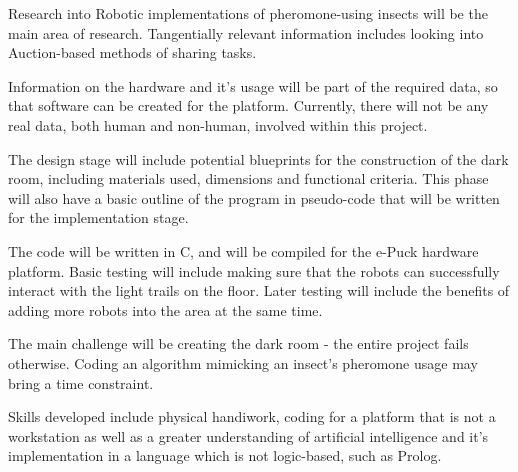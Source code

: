 Research into Robotic implementations of pheromone-using insects will be the 
main area of research\cite{Yanovski2003,Ranjbar-Sahraei2012,Broecker2015}.
Tangentially relevant information includes looking into Auction-based
methods of sharing tasks\cite{Schneider2015}.

Information on the hardware and it's usage will be part of the required data,
so that software can be created for the platform.  Currently, there will not be
any real data, both human and non-human, involved within this project.

The design stage will include potential blueprints for the construction of the 
dark room, including materials used, dimensions and functional criteria.
This phase will also have a basic outline of the program in pseudo-code that 
will be written for the implementation stage.  

The code will be written in C, and will be compiled for the e-Puck hardware
platform.  Basic testing will include making sure that the robots can
successfully interact with the light trails on the floor.  Later testing will
include the benefits of adding more robots into the area at the same time.

The main challenge will be creating the dark room - the entire project fails
otherwise.  Coding an algorithm mimicking an insect's pheromone usage may bring
a time constraint.

Skills developed include physical handiwork, coding for a platform that is not a
workstation as well as a greater understanding of artificial intelligence and 
it's implementation in a language which is not logic-based, such as Prolog.